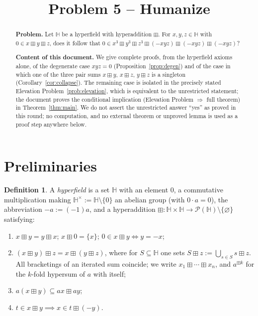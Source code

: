 \documentclass[11pt]{article}
\title{Problem 5 -- Humanize}
\author{}
\date{}
\theoremstyle{definition}
\newtheorem{definition}[theorem]{Definition}
\theoremstyle{remark}
\newcommand{\Hb}{\mathbb{H}}
\newcommand{\bp}{\boxplus}
\begin{document}
\maketitle

\begin{abstract}
\noindent\textbf{Problem.} Let $\Hb$ be a hyperfield with hyperaddition
$\boxplus$. For $x,y,z\in\Hb$ with $0\in x\bp y\bp z$, does it follow that
$0\in x^{3}\bp y^{3}\bp z^{3}\bp(-xyz)\bp(-xyz)\bp(-xyz)$?

\smallskip\noindent\textbf{Content of this document.} We give complete
proofs, from the hyperfield axioms alone, of the degenerate case $xyz=0$
(Proposition~\ref{prop:degen}) and of the case in which one of the three
pair sums $x\bp y$, $x\bp z$, $y\bp z$ is a singleton
(Corollary~\ref{cor:collapse}). The remaining case is isolated in the
precisely stated Elevation Problem~\ref{prob:elevation}, which is
equivalent to the unrestricted statement; the document proves the
conditional implication (Elevation Problem $\Rightarrow$ full theorem) in
Theorem~\ref{thm:main}. We do not assert the unrestricted answer ``yes''
as proved in this round; no computation, and no external theorem
or unproved lemma is used as a proof step anywhere below.
\end{abstract}

\section{Preliminaries}\label{sec:prelim}

\begin{definition}\label{def:hf}
A \emph{hyperfield} is a set $\Hb$ with an element $0$, a commutative
multiplication making $\Hb^\times:=\Hb\setminus\{0\}$ an abelian group
(with $0\cdot a=0$), the abbreviation $-a:=(-1)a$, and a hyperaddition
$\bp:\Hb\times\Hb\to\mathcal P(\Hb)\setminus\{\varnothing\}$ satisfying:
\begin{enumerate}[label=(H\arabic*)]
\item $x\bp y=y\bp x$;\; $x\bp0=\{x\}$;\; $0\in x\bp y\iff y=-x$;
\item $(x\bp y)\bp z=x\bp(y\bp z)$, where for $S\subseteq\Hb$ one sets
$S\bp z:=\bigcup_{s\in S}s\bp z$. All bracketings of an iterated sum
coincide; we write $x_1\bp\cdots\bp x_n$, and $a^{\bp k}$ for the $k$-fold
hypersum of $a$ with itself;
\item $a(x\bp y)\subseteq ax\bp ay$;
\item $t\in x\bp y\implies x\in t\bp(-y)$.
\end{enumerate}
\end{definition}
\end{document}
